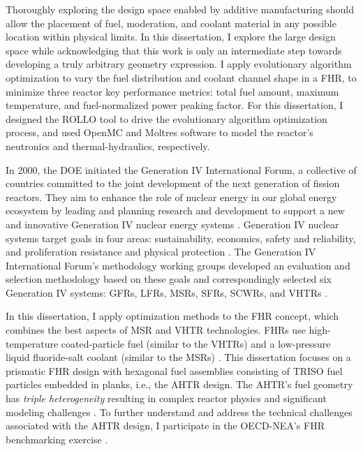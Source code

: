 Thoroughly exploring the design space enabled by additive manufacturing should allow 
the placement of fuel, moderation, and coolant material in any possible location 
within physical limits. 
In this dissertation, I explore the large design space while acknowledging that 
this work is only an intermediate step towards developing a truly arbitrary 
geometry expression. 
I apply evolutionary algorithm optimization to vary the fuel distribution and 
coolant channel shape in a \gls{FHR}, to minimize three reactor key performance 
metrics: total fuel amount, maximum temperature, and fuel-normalized power peaking 
factor. 
For this dissertation, I designed the \gls{ROLLO} tool \cite{chee_rollo_2021} to drive 
the evolutionary algorithm optimization process, and used OpenMC 
\cite{romano_openmc:_2015} and Moltres \cite{lindsay_introduction_2018} software to 
model the reactor's neutronics and thermal-hydraulics, respectively.  

In 2000, the \gls{DOE} initiated the Generation IV International Forum, a collective 
of countries committed to the joint development of the next generation of fission 
reactors.
They aim to enhance the role of nuclear energy in our global energy ecosystem by 
leading and planning research and development to support a new and innovative 
Generation IV nuclear energy systems \cite{gif_technology_2002}.
Generation IV nuclear systems target goals in four areas: sustainability, 
economics, safety and reliability, and proliferation resistance and physical 
protection \cite{gif_technology_2002}. 
The Generation IV International Forum's methodology working groups developed 
an evaluation and selection methodology based on these goals 
and correspondingly selected six Generation IV systems: \glspl{GFR}, 
\glspl{LFR}, \glspl{MSR}, \glspl{SFR}, \glspl{SCWR}, and \glspl{VHTR} 
\cite{gif_technology_2002}. 

In this dissertation, I apply optimization methods to the \gls{FHR} concept, which 
combines the best aspects of \gls{MSR} and \gls{VHTR} technologies. 
\glspl{FHR} use high-temperature coated-particle fuel (similar to the \glspl{VHTR}) 
and a low-pressure liquid fluoride-salt coolant (similar to the \glspl{MSR})
\cite{forsberg_fluoride-salt-cooled_2012,facilitators_fluoride-salt-cooled_2013}.
This dissertation focuses on a prismatic \gls{FHR} design with hexagonal fuel 
assemblies consisting of \gls{TRISO} fuel particles embedded in planks, i.e., 
the \gls{AHTR} design.
The \gls{AHTR}'s fuel geometry has \emph{triple heterogeneity} resulting in 
complex reactor physics and significant modeling challenges 
\cite{petrovic_benchmark_2021}. 
To further understand and address the technical challenges associated with the 
\gls{AHTR} design, I participate in the \gls{OECD}-\gls{NEA}'s \gls{FHR} 
benchmarking exercise \cite{petrovic_benchmark_2021}.

